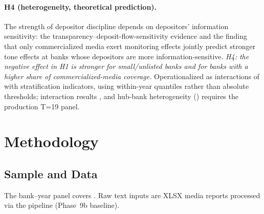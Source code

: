 \paragraph{H4 (heterogeneity, theoretical prediction).}
The strength of depositor discipline depends on depositors'
information sensitivity: the transparency--deposit-flow-sensitivity
evidence \parencite{chen2022transparency} and the finding that only
commercialized media exert monitoring effects \parencite{you2018pen}
jointly predict stronger tone effects at banks whose depositors are
more information-sensitive. \emph{H4: the negative effect in H1 is
stronger for small/unlisted banks and for banks with a higher share of
commercialized-media coverage.} Operationalized as interactions of
 with stratification indicators, using
within-year quantiles rather than absolute thresholds; interaction
results , and hub-bank
heterogeneity () requires the production T=19
panel.

\section{Methodology}\label{sec:method}
\subsection{Sample and Data}
The bank--year panel covers . Raw text
inputs are XLSX media reports processed via the 
pipeline (Phase~9b baseline).

